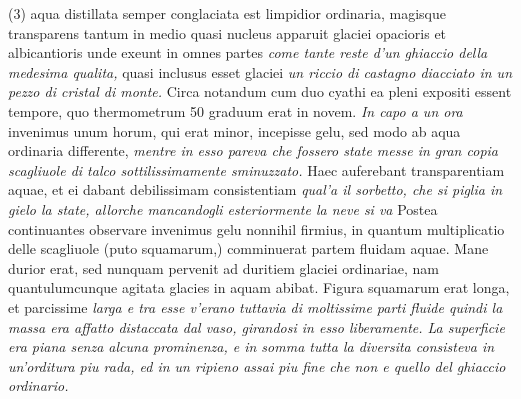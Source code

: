 (3)  aqua distillata\protect{} semper conglaciata est limpidior ordinaria, magisque transparens tantum in medio quasi nucleus apparuit glaciei opacioris et albicantioris unde exeunt in omnes  partes \textit{come tante reste d'un ghiaccio della medesima qualita,}  quasi inclusus esset glaciei \textit{un riccio di castagno diacciato in un  pezzo di cristal di monte. }Circa  notandum cum  duo cyathi ea pleni expositi essent tempore, quo thermometrum\protect{} 50 graduum erat in novem. \textit{In capo a un ora} invenimus  unum horum, qui erat minor, incepisse gelu, sed modo ab aqua ordinaria  differente, \textit{mentre in esso pareva che fossero state messe in gran  copia scagliuole di talco sottilissimamente sminuzzato. }Haec auferebant  transparentiam aquae, et ei dabant debilissimam consistentiam \textit{qual'a  il sorbetto, che si piglia in gielo la state, allorche mancandogli esteriormente la neve si va } Postea continuantes observare invenimus gelu nonnihil firmius, in quantum multiplicatio delle scagliuole (puto  squamarum,) comminuerat partem fluidam aquae. Mane durior erat, sed  nunquam pervenit ad duritiem glaciei ordinariae, nam quantulumcunque  agitata glacies in aquam abibat. Figura squamarum erat longa,  et parcissime \textit{larga e tra esse v'erano tuttavia di moltissime parti  fluide quindi la massa era affatto distaccata dal vaso, girandosi in esso  liberamente. La superficie era piana senza alcuna prominenza, e  in somma tutta la diversita consisteva in un'orditura piu rada, ed in  un ripieno assai piu fine che non e quello del ghiaccio ordinario.}\pend
